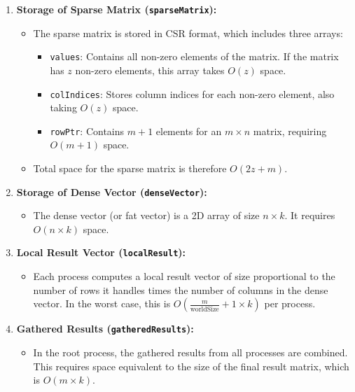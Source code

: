 \documentclass[12pt,oneside]{book} %
\begin{document}
\begin{enumerate}
    \item \textbf{Storage of Sparse Matrix (\texttt{sparseMatrix}):}
          \begin{itemize}
              \item The sparse matrix is stored in CSR format, which includes three arrays:
                    \begin{itemize}
                        \item \texttt{values}: Contains all non-zero elements of the matrix. If the matrix has \( z \) non-zero elements, this array takes \( O(z) \) space.
                        \item \texttt{colIndices}: Stores column indices for each non-zero element, also taking \( O(z) \) space.
                        \item \texttt{rowPtr}: Contains \( m + 1 \) elements for an \( m \times n \) matrix, requiring \( O(m + 1) \) space.
                    \end{itemize}
              \item Total space for the sparse matrix is therefore \( O(2z + m) \).
          \end{itemize}

    \item \textbf{Storage of Dense Vector (\texttt{denseVector}):}
          \begin{itemize}
              \item The dense vector (or fat vector) is a 2D array of size \( n \times k \). It
                    requires \( O(n \times k) \) space.
          \end{itemize}

    \item \textbf{Local Result Vector (\texttt{localResult}):}
          \begin{itemize}
              \item Each process computes a local result vector of size proportional to the number
                    of rows it handles times the number of columns in the dense vector. In the
                    worst case, this is \( O\left(\frac{m}{\text{worldSize}} + 1 \times k\right) \)
                    per process.
          \end{itemize}

    \item \textbf{Gathered Results (\texttt{gatheredResults}):}
          \begin{itemize}
              \item In the root process, the gathered results from all processes are combined. This
                    requires space equivalent to the size of the final result matrix, which is \(
                    O(m \times k) \).
          \end{itemize}


\end{enumerate}
\end{document}

